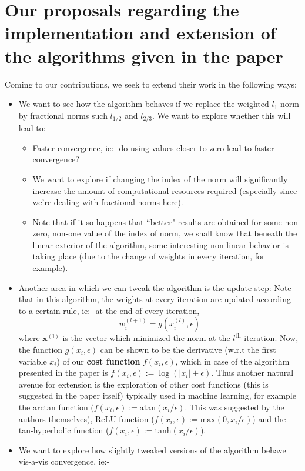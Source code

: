 \documentclass[a4paper,11pt]{article}
\numberwithin{definition}{section}
\numberwithin{mytheorem}{subsection}
\begin{document}
\section{Our proposals regarding the implementation and extension of the algorithms given in the paper}
Coming to our contributions, we seek to extend their work in the following ways:
\begin{itemize}
\item We want to see how the algorithm behaves if we replace the weighted $l_1$ norm by fractional norms such $l_{1/2}$ and $l_{2/3}$. We want to explore whether this will lead to:
\begin{itemize}
\item Faster convergence, ie:- do using values closer to zero lead to faster convergence?
\item We want to explore if changing the index of the norm will significantly increase the amount of computational resources required (especially since we're dealing with fractional norms here).
\item Note that if it so happens that ``better" results are obtained for some non-zero, non-one value of the index of norm, we shall know that beneath the linear exterior of the algorithm, some interesting non-linear behavior is taking place (due to the change of weights in every iteration, for example).
\end{itemize}
\item Another area in which we can tweak the algorithm is the update step: Note that in this algorithm, the weights at every iteration are updated according to a certain rule, ie:- at the end of every iteration, 
$$w^{(l+1)}_i = g(x_i^{(l)}, \epsilon)$$
where $\mathbf{x^{(l)}}$ is the vector which minimized the norm at the $l^{\mathrm{th}}$ iteration. Now, the function $g(x_i, \epsilon)$ can be shown to be the derivative (w.r.t the first variable $x_i$) of our \textbf{cost function} $f(x_i, \epsilon)$, which in case of the algorithm presented in the paper is $f(x_i, \epsilon) := \log (|x_i| + \epsilon)$. Thus another natural avenue for extension is the exploration of other cost functions (this is suggested in the paper itself) typically used in machine learning, for example the arctan function ($f(x_i, \epsilon) :=$atan$(x_i/\epsilon)$. This was suggested by the authors themselves), ReLU function ($f(x_i, \epsilon) := \mathrm{max}(0, x_i/\epsilon)$) and the tan-hyperbolic function ($f(x_i, \epsilon) := \mathrm{tanh}(x_i/\epsilon)$).
\item We want to explore how slightly tweaked versions of the algorithm behave vis-a-vis convergence, ie:-

\end{itemize}
\end{document}
